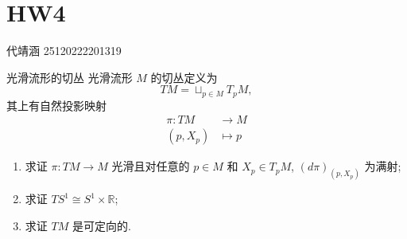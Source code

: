 \documentclass[../main.tex]{subfiles}
\begin{document}
\ifSubfilesClassLoaded{

    
}{}

\chapter{ HW4 }
 代靖涵 25120222201319
\begin{exercise}{光滑流形的切丛}{}
光滑流形 $M$ 的切丛定义为
\[
TM = \sqcup_{p \in M} T_p M,
\]
其上有自然投影映射
\[\begin{aligned}
 \pi: TM &\to M \\
(p, X_p) &\mapsto p
\end{aligned}\]
\begin{enumerate}
    \item[a).] 求证 $\pi: TM \to M$ 光滑且对任意的 $p \in M$ 和 $X_p \in T_p M$, $(d\pi)_{(p,X_p)}$ 为满射;
    \item[b).] 求证 $TS^1 \cong S^1 \times \mathbb{R}$;
    \item[c).] 求证 $TM$ 是可定向的.
\end{enumerate}
\end{exercise}
\end{document}
